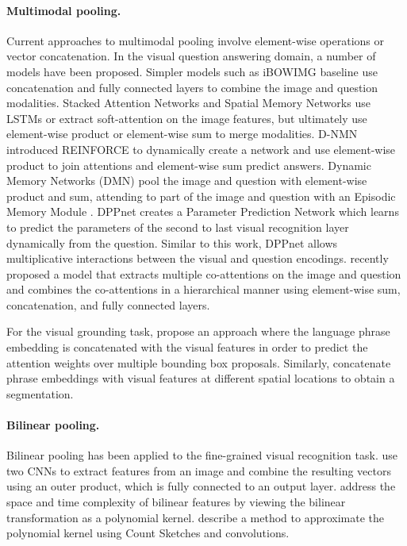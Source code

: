 \documentclass[11pt,letterpaper]{article}
\begin{document}
\paragraph{Multimodal pooling.}
Current approaches to multimodal pooling involve element-wise operations or vector concatenation.
In the visual question answering domain, a number of models have been proposed. Simpler models such as iBOWIMG baseline \cite{zhou2015simple} use concatenation and fully connected layers to combine the image and question modalities.
Stacked Attention Networks \cite{yang2015stacked} and Spatial Memory Networks \cite{xu15icml} use LSTMs or extract soft-attention on the image features, but ultimately use element-wise product or element-wise sum to merge modalities.
D-NMN \cite{andreas16naacl} introduced REINFORCE to dynamically create a network and use element-wise product to join attentions and element-wise sum predict answers.
Dynamic Memory Networks (DMN) \cite{xiong16dynamic} pool the image and question with element-wise product and sum, attending to part of the image and question with an Episodic Memory Module \cite{kumar15arxiv}.
DPPnet \cite{noh2015images} creates a Parameter Prediction Network which learns to predict the parameters of the second to last visual recognition layer dynamically from the question. Similar to this work, DPPnet allows multiplicative interactions between the visual and question encodings.
 recently proposed a model that extracts multiple co-attentions on the image and question and combines the co-attentions in a hierarchical manner using element-wise sum, concatenation, and fully connected layers.

















For the visual grounding task,  propose an approach where the language phrase embedding is concatenated with the visual features in order to predict the attention weights over multiple bounding box proposals. Similarly,  concatenate phrase embeddings with visual features at different spatial locations to obtain a segmentation.

\paragraph{Bilinear pooling.} Bilinear pooling has been applied to the fine-grained visual recognition task.  use two CNNs to extract features from an image and combine the resulting vectors using an outer product, which is fully connected to an output layer.  address the space and time complexity of bilinear features by viewing the bilinear transformation as a polynomial kernel.  describe a method to approximate the polynomial kernel using Count Sketches and convolutions. 
\end{document}
